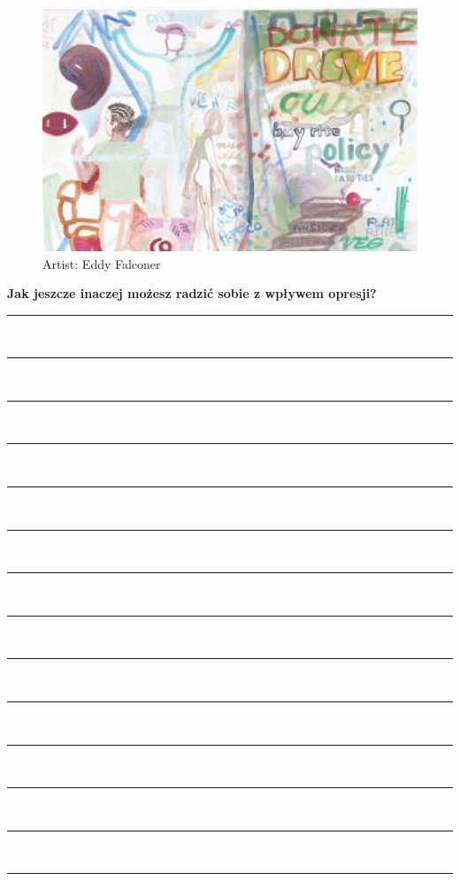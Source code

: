 \newpage
\begin{figure}[h]
\centering
\includegraphics[width=16cm]{TeX_files/3-2.png}
\caption{Artist: Eddy Falconer}
\label{3-2}
\end{figure}

\noindent\textcolor{ProcessBlue}{\textbf{\Large{Jak jeszcze inaczej możesz radzić sobie z wpływem opresji?}}}\\
\noindent\rule{\textwidth}{1pt}\\
\noindent\rule{\textwidth}{1pt}\\
\noindent\rule{\textwidth}{1pt}\\
\noindent\rule{\textwidth}{1pt}\\
\noindent\rule{\textwidth}{1pt}\\
\noindent\rule{\textwidth}{1pt}\\
\noindent\rule{\textwidth}{1pt}\\
\noindent\rule{\textwidth}{1pt}\\
\noindent\rule{\textwidth}{1pt}\\
\noindent\rule{\textwidth}{1pt}\\
\noindent\rule{\textwidth}{1pt}\\
\noindent\rule{\textwidth}{1pt}\\
\noindent\rule{\textwidth}{1pt}\\
\noindent\rule{\textwidth}{1pt}\\\\

